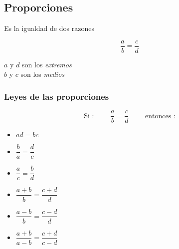 \documentclass[10pt, twocolumn, landscape, a4paper]{article}
\begin{document}
\subsection*{Proporciones}

Es la igualdad de dos razones

$$
\dfrac{a}{b} = \dfrac{c}{d}
$$

\noindent $a$ y $d$ son los \textit{extremos} \\
$b$ y $c$ son los \textit{medios} \\

\subsubsection*{Leyes de las proporciones}

$$
\text{Si : }\qquad\dfrac{a}{b} = \dfrac{c}{d}\qquad\text{ entonces :}
$$
\begin{multicols}{2}
	\begin{itemize}
	\item{$ad = bc$}
	\item{$\dfrac{b}{a} = \dfrac{d}{c}$}
	\item{$\dfrac{a}{c} = \dfrac{b}{d}$}
	\item{$\dfrac{a + b}{b} = \dfrac{c + d}{d}$}
	\item{$\dfrac{a - b}{b} = \dfrac{c - d}{d}$}
	\item{$\dfrac{a + b}{a - b} = \dfrac{c + d}{c - d}$}
	\end{itemize}
\end{multicols}
\end{document}
